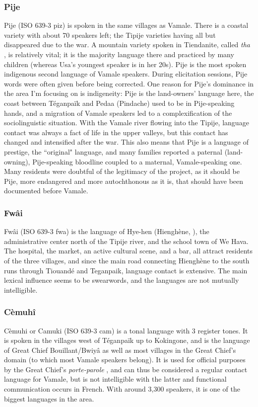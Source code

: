  \subsubsection{Pije}
 Pije (ISO 639-3 piz) is spoken in the same villages as Vamale. There is a coastal variety with about 70 speakers left; the Tipije varieties having all but disappeared due to the war. A mountain variety spoken in Tiendanite, called \textit{tha} \parencite[229]{haudricourt_langue_1968}, is relatively vital; it is the majority language there and practiced by many children (whereas Usa's youngest speaker is in her 20s). Pije is the most spoken indigenous second language of Vamale speakers. During elicitation sessions, Pije words were often given before being corrected. One reason for Pije's dominance in the area I'm focusing on is indigeneity: Pije is the land-owners' language here, the coast between Téganpaïk and Pedaa (Pindache) used to be in Pije-speaking hands, and a migration of Vamale speakers led to a complexification of the sociolinguistic situation. With the Vamale river flowing into the Tipije, language contact was always a fact of life in the upper valleys, but this contact has changed and intensified after the war. This also means that Pije is a language of prestige, the ``original" language, and many families reported a paternal (land-owning), Pije-speaking bloodline coupled to a maternal, Vamale-speaking one. Many residents were doubtful of the legitimacy of the project, as it should be Pije, more endangered and more autochthonous as it is, that should have been documented before Vamale. 
 
 \subsubsection{Fwâi}
 Fwâi (ISO 639-3 fwa) is the language of Hye-hen (Hienghène, ), the administrative center north of the Tipije river, and the school town of We Hava. The hospital, the market, an active cultural scene, and a bar, all attract residents of the three villages, and since the main road connecting Hienghène to the south runs through Tiouandé and Teganpaik, language contact is extensive. The main lexical influence seems to be swearwords, and the languages are not mutually intelligible.
 
 \subsubsection{Cèmuhî}\largerpage
 Cèmuhi or Camuki (ISO 639-3 cam) is a tonal language with 3 register tones. It is spoken in the villages west of Téganpaïk up to Kokingone, and is the language of Great Chief Bouillant/Bwiyâ as well as most villages in the Great Chief's domain (to which most Vamale speakers belong). It is used for official purposes by the Great Chief's \textit{porte-parole} , and can thus be considered a regular contact language for Vamale, but is not intelligible with the latter and functional communication occurs in French. %
 With around 3,300 speakers, it is one of the biggest languages in the area. 

